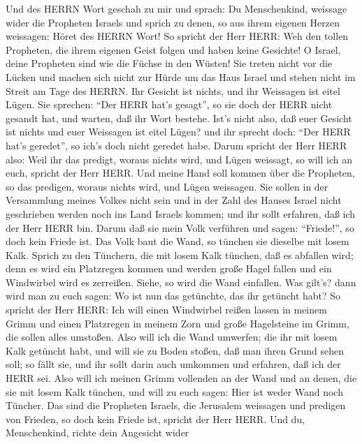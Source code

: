  Und des HERRN Wort geschah zu mir und sprach: 
Du Menschenkind, weissage wider die Propheten Israels und sprich zu
denen, so aus ihrem eigenen Herzen weissagen: Höret des HERRN Wort!
 So spricht der Herr HERR: Weh den tollen Propheten, die
ihrem eigenen Geist folgen und haben keine Gesichte!  O
Israel, deine Propheten sind wie die Füchse in den Wüsten! 
Sie treten nicht vor die Lücken und machen sich nicht zur Hürde um das
Haus Israel und stehen nicht im Streit am Tage des HERRN. 
Ihr Gesicht ist nichts, und ihr Weissagen ist eitel Lügen. Sie sprechen:
``Der HERR hat's gesagt'', so sie doch der HERR nicht gesandt hat, und
warten, daß ihr Wort bestehe.  Ist's nicht also, daß euer
Gesicht ist nichts und euer Weissagen ist eitel Lügen? und ihr sprecht
doch: ``Der HERR hat's geredet'', so ich's doch nicht geredet habe.
 Darum spricht der Herr HERR also: Weil ihr das predigt,
woraus nichts wird, und Lügen weissagt, so will ich an euch, spricht der
Herr HERR.  Und meine Hand soll kommen über die Propheten,
so das predigen, woraus nichts wird, und Lügen weissagen. Sie sollen in
der Versammlung meines Volkes nicht sein und in der Zahl des Hauses
Israel nicht geschrieben werden noch ins Land Israels kommen; und ihr
sollt erfahren, daß ich der Herr HERR bin.  Darum daß sie
mein Volk verführen und sagen: ``Friede!'', so doch kein Friede ist. Das
Volk baut die Wand, so tünchen sie dieselbe mit losem Kalk.
 Sprich zu den Tünchern, die mit losem Kalk tünchen, daß es
abfallen wird; denn es wird ein Platzregen kommen und werden große Hagel
fallen und ein Windwirbel wird es zerreißen.  Siehe, so
wird die Wand einfallen. Was gilt's? dann wird man zu euch sagen: Wo ist
nun das getünchte, das ihr getüncht habt?  So spricht der
Herr HERR: Ich will einen Windwirbel reißen lassen in meinem Grimm und
einen Platzregen in meinem Zorn und große Hagelsteine im Grimm, die
sollen alles umstoßen.  Also will ich die Wand umwerfen;
die ihr mit losem Kalk getüncht habt, und will sie zu Boden stoßen, daß
man ihren Grund sehen soll; so fällt sie, und ihr sollt darin auch
umkommen und erfahren, daß ich der HERR sei.  Also will ich
meinen Grimm vollenden an der Wand und an denen, die sie mit losem Kalk
tünchen, und will zu euch sagen: Hier ist weder Wand noch Tüncher.
 Das sind die Propheten Israels, die Jerusalem weissagen
und predigen von Frieden, so doch kein Friede ist, spricht der Herr
HERR.  Und du, Menschenkind, richte dein Angesicht wider
